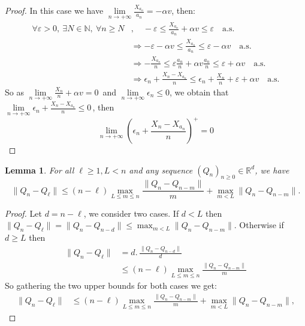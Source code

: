 \documentclass[11pt]{article}
\theoremstyle{plain}
\newtheorem{lemma}[theorem]{Lemma}
\theoremstyle{definition}
\begin{document}
\begin{appendix}
\begin{proof}
	In this case we have \(\lim\limits_{n \to +\infty} \frac{X_{a_n}}{a_n} = -\alpha v\), then:
	\begin{align*}
		\forall \varepsilon > 0,\ \exists N \in \mathbb{N},\ \forall n \geq N &,\quad -\varepsilon \leq \frac{X_{a_n}}{a_n} + \alpha v \leq \varepsilon \quad \text{a.s.}\\		
		&\Rightarrow -\varepsilon - \alpha v \leq \frac{X_{a_n}}{a_n} \leq \varepsilon - \alpha v \quad \text{a.s.}\\
		&\Rightarrow -\frac{X_{a_n}}{n} \leq \varepsilon \frac{a_n}{n} + \alpha v \frac{a_n}{n} \leq \varepsilon + \alpha v \quad \text{a.s.}\\
		&\Rightarrow \epsilon_n + \frac{X_n - X_{a_n}}{n} \leq \epsilon_n + \frac{X_n}{n} + \varepsilon + \alpha v \quad \text{a.s.}		
	\end{align*}	
	So as \(\lim\limits_{n \to +\infty} \frac{X_n}{n} + \alpha v = 0\,\) and \(\lim\limits_{n \to +\infty} \epsilon_n \leq 0\), we obtain that \(\lim\limits_{n \to +\infty} \epsilon_n + \frac{X_n - X_{a_n}}{n} \leq 0 \,\), then 
	\[\lim\limits_{n \to +\infty} \left(\epsilon_n +\frac{X_n - X_{a_n}}{n}\right)^+ = 0 \]
\end{proof}

\begin{lemma}\label{lem:mart-2}
	For all \( \ell \geq 1, L < n \) and any sequence \( (Q_n)_{n \geq 0} \in \mathbb{R}^d \), we have
	\[
	\|Q_n - Q_\ell\| \leq (n - \ell) \max_{L \leq m \leq n} \frac{\|Q_n - Q_{n - m}\|}{m} + \max_{m < L} \|Q_n - Q_{n - m}\|.
	\]
\end{lemma}

\begin{proof}
	Let \( d = n - \ell \), we consider two cases. If \( d < L \) then \(\|Q_n - Q_\ell\| = \|Q_n - Q_{n - d}\| \leq \max_{m < L} \|Q_n - Q_{n - m}\|.\)
	Otherwise if \( d \geq L \) then
	\begin{align*}
		\|Q_n - Q_\ell\| &= d.\,\frac{\|Q_n - Q_{n-d}\|}{d} \\		
		& \leq \left(n - \ell\right) \max_{L \leq m \leq n} \frac{\|Q_n - Q_{n-m}\|}{m}
	\end{align*}
	So gathering the two upper bounds for both cases we get:	
	\begin{align*}
		\|Q_n - Q_\ell\| &\leq (n - \ell) \max_{L \leq m \leq n} \frac{\|Q_n - Q_{n - m}\|}{m} + \max_{m < L} \|Q_n - Q_{n - m}\|,
	\end{align*}	
\end{proof}


	\end{appendix}
	
	
\end{document}
